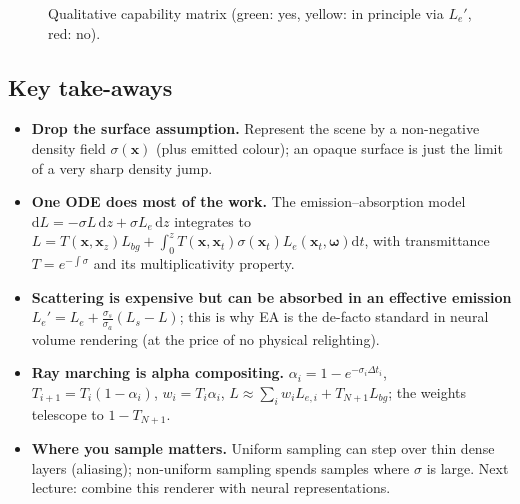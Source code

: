 \documentclass[11pt,a4paper]{article}
\newcommand{\x}{{\bm{x}}}
\newcommand{\w}{{\bm{\omega}}}
\theoremstyle{definition}
\theoremstyle{plain}
\theoremstyle{remark}
\begin{document}
\begin{figure}[h]
\centering
{}
\caption{Qualitative capability matrix (green: yes, yellow: in principle via $L_e'$, red: no).}\label{fig:matrix}
\end{figure}

\subsection{Key take-aways}
\begin{itemize}[leftmargin=1.4em]
 \item \textbf{Drop the surface assumption.} Represent the scene by a non-negative density field $\sigma(\x)$ (plus emitted colour); an opaque surface is just the limit of a very sharp density jump.
 \item \textbf{One ODE does most of the work.} The emission--absorption model $\mathrm dL=-\sigma L\,\mathrm dz+\sigma L_e\,\mathrm dz$ integrates to $L=T(\x,\x_z)L_{bg}+\int_0^zT(\x,\x_t)\sigma(\x_t)L_e(\x_t,\w)\mathrm dt$, with transmittance $T=e^{-\int\sigma}$ and its multiplicativity property.
 \item \textbf{Scattering is expensive but can be absorbed in an effective emission} $L_e'=L_e+\tfrac{\sigma_s}{\sigma_a}(L_s-L)$; this is why EA is the de-facto standard in neural volume rendering (at the price of no physical relighting).
 \item \textbf{Ray marching is alpha compositing.} $\alpha_i=1-e^{-\sigma_i\Delta t_i}$, $T_{i+1}=T_i(1-\alpha_i)$, $w_i=T_i\alpha_i$, $L\approx\sum_iw_iL_{e,i}+T_{N+1}L_{bg}$; the weights telescope to $1-T_{N+1}$.
 \item \textbf{Where you sample matters.} Uniform sampling can step over thin dense layers (aliasing); non-uniform sampling spends samples where $\sigma$ is large. Next lecture: combine this renderer with neural representations.
\end{itemize}
\end{document}
